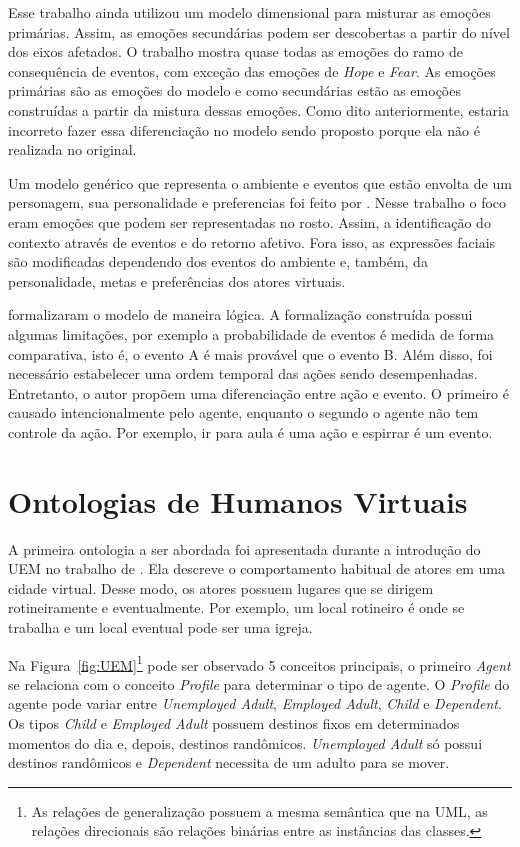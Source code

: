 Esse trabalho ainda utilizou um modelo dimensional para misturar as emoções
primárias. Assim, as emoções secundárias podem ser descobertas a partir do
nível dos eixos afetados. O trabalho mostra quase todas as emoções do
ramo de consequência de eventos, com exceção das emoções de \emph{Hope} e
\emph{Fear}. As emoções primárias são as emoções do modelo \occ e como
secundárias estão as emoções construídas a partir da mistura dessas emoções.
Como dito anteriormente, estaria incorreto fazer essa diferenciação no modelo
sendo proposto porque ela não é realizada no original.

Um modelo genérico que representa o ambiente e eventos que estão envolta de um
personagem, sua personalidade e preferencias foi feito por
\citet{lera2009semantic}. Nesse trabalho o foco eram emoções que podem ser
representadas no rosto. Assim, a identificação do contexto através de eventos
e do retorno afetivo. Fora isso, as expressões faciais são modificadas
dependendo dos eventos do ambiente e, também, da personalidade, metas e
preferências dos atores virtuais.

\citet{adam2009alfototoe} formalizaram o modelo \occ de maneira lógica. A
formalização construída possui algumas limitações, por exemplo a probabilidade
de eventos é medida de forma comparativa, isto é, o evento A é mais provável
que o evento B. Além disso, foi necessário estabelecer uma ordem temporal
das ações sendo desempenhadas.  Entretanto, o autor propõem uma diferenciação
entre ação e evento. O primeiro é causado intencionalmente pelo agente\dev{},
enquanto o segundo o agente não tem controle da ação. Por exemplo, ir para
aula é uma ação e espirrar é um evento.

\section{Ontologias de Humanos Virtuais} \label{cap:eda:odhv}

A primeira ontologia a ser abordada foi apresentada durante a introdução do
UEM no trabalho de \citet{paiva2005ontology}. Ela descreve o comportamento
habitual de atores em uma cidade virtual. Desse modo, os atores possuem
lugares que se dirigem rotineiramente e eventualmente. Por exemplo, um local
rotineiro é onde se trabalha e um local eventual pode ser uma igreja.

Na Figura~\ref{fig:UEM}\footnote{As relações de generalização possuem a mesma
semântica que na UML, as relações direcionais são relações binárias entre as
instâncias das classes.} pode ser observado 5 conceitos principais, o primeiro
\emph{Agent} se relaciona com o conceito \emph{Profile} para determinar o tipo
de agente. O \emph{Profile} do agente pode variar entre \emph{Unemployed Adult},
\emph{Employed Adult}, \emph{Child} e \emph{Dependent}. Os tipos \emph{Child}
e \emph{Employed Adult} possuem destinos fixos em determinados momentos do dia
e, depois, destinos randômicos. \emph{Unemployed Adult} só possui destinos
randômicos e \emph{Dependent} necessita de um adulto para se mover.

